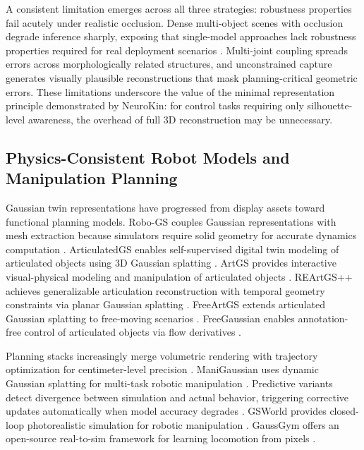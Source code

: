 \documentclass[12pt,a4paper,oneside]{report}
\begin{document}
A consistent limitation emerges across all three strategies: robustness properties fail acutely under realistic occlusion. Dense multi-object scenes with occlusion degrade inference sharply, exposing that single-model approaches lack robustness properties required for real deployment scenarios \cite{li2025art, zhang2025simart}. Multi-joint coupling spreads errors across morphologically related structures, and unconstrained capture generates visually plausible reconstructions that mask planning-critical geometric errors. These limitations underscore the value of the minimal representation principle demonstrated by NeuroKin: for control tasks requiring only silhouette-level awareness, the overhead of full 3D reconstruction may be unnecessary.

\subsection{Physics-Consistent Robot Models and Manipulation Planning}

Gaussian twin representations have progressed from display assets toward functional planning models. Robo-GS couples Gaussian representations with mesh extraction because simulators require solid geometry for accurate dynamics computation \cite{lou2024robogs}. ArticulatedGS enables self-supervised digital twin modeling of articulated objects using 3D Gaussian splatting \cite{guo2025articulatedgs}. ArtGS provides interactive visual-physical modeling and manipulation of articulated objects \cite{yu2025artgs}. REArtGS++ achieves generalizable articulation reconstruction with temporal geometry constraints via planar Gaussian splatting \cite{wu2025reartgs}. FreeArtGS extends articulated Gaussian splatting to free-moving scenarios \cite{dai2025freeartgs}. FreeGaussian enables annotation-free control of articulated objects via flow derivatives \cite{chen2025freegaussian}.

Planning stacks increasingly merge volumetric rendering with trajectory optimization for centimeter-level precision \cite{sun2026digitaltwin}. ManiGaussian uses dynamic Gaussian splatting for multi-task robotic manipulation \cite{lu2024manigaussian}. Predictive variants detect divergence between simulation and actual behavior, triggering corrective updates automatically when model accuracy degrades \cite{pan2025selfcorrecting}. GSWorld provides closed-loop photorealistic simulation for robotic manipulation \cite{jiang2025gsworld}. GaussGym offers an open-source real-to-sim framework for learning locomotion from pixels \cite{escontrela2025gaussgym}.
\end{document}
